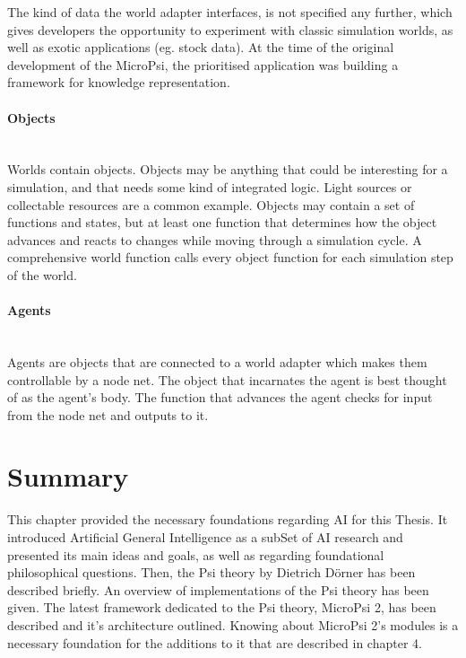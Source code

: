 The kind of data the world adapter interfaces, is not specified any further, which gives developers the opportunity to experiment with classic simulation worlds, as well as exotic applications (eg. stock data). At the time of the original development of the MicroPsi, the prioritised application was building a framework for knowledge representation.

            \paragraph{Objects}$\;$ \\
Worlds contain objects. Objects may be anything that could be interesting for a simulation, and that needs some kind of integrated logic. Light sources or collectable resources are a common example. Objects may contain a set of functions and states, but at least one function that determines how the object advances and reacts to changes while moving through a simulation cycle. A comprehensive world function calls every object function for each simulation step of the world.

            \paragraph{Agents}$\;$ \\
Agents are objects that are connected to a world adapter which makes them controllable by a node net. The object that incarnates the agent is best thought of as the agent's body. The function that advances the agent checks for input from the node net and outputs to it.
        
    \section{Summary}
This chapter provided the necessary foundations regarding AI for this Thesis. It introduced Artificial General Intelligence as a subSet of AI research and presented its main ideas and goals, as well as regarding foundational philosophical questions.
Then, the Psi theory by Dietrich Dörner has been described briefly. An overview of implementations of the Psi theory has been given. The latest framework dedicated to the Psi theory, MicroPsi 2, has been described and it's architecture outlined. Knowing about MicroPsi 2's modules is a necessary foundation for the additions to it that are described in chapter 4.

